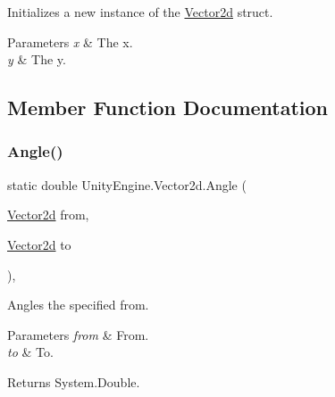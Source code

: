 Initializes a new instance of the \hyperlink{struct_unity_engine_1_1_vector2d}{Vector2d} struct. 


\begin{DoxyParams}{Parameters}
{\em x} & The x.\\
\hline
{\em y} & The y.\\
\hline
\end{DoxyParams}


\subsection{Member Function Documentation}
\mbox{\label{struct_unity_engine_1_1_vector2d_a9a37829a34f1ce629b91c335842f842c}} 
\subsubsection{\texorpdfstring{Angle()}{Angle()}}
{\footnotesize\ttfamily static double Unity\+Engine.\+Vector2d.\+Angle (\begin{DoxyParamCaption}\item[{\hyperlink{struct_unity_engine_1_1_vector2d}{Vector2d}}]{from,  }\item[{\hyperlink{struct_unity_engine_1_1_vector2d}{Vector2d}}]{to }\end{DoxyParamCaption})\hspace{0.3cm}{\ttfamily [inline]}, {\ttfamily [static]}}



Angles the specified from. 


\begin{DoxyParams}{Parameters}
{\em from} & From.\\
\hline
{\em to} & To.\\
\hline
\end{DoxyParams}
\begin{DoxyReturn}{Returns}
System.\+Double.
\end{DoxyReturn}
\mbox{\label{struct_unity_engine_1_1_vector2d_a42def52ec6e0d493e60387a1f09912e0}} 
